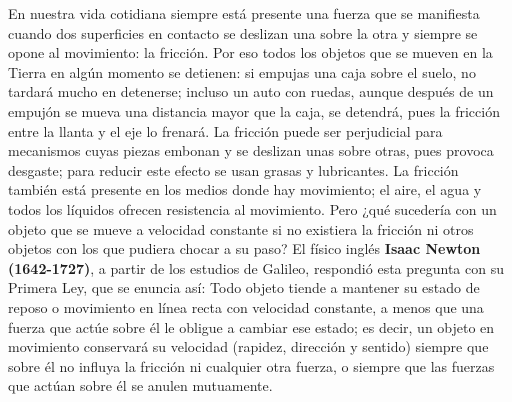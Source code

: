 \documentclass[11pt]{book}
\begin{document}
En nuestra vida cotidiana siempre está presente una fuerza que se manifiesta cuando
dos superficies en contacto se deslizan una sobre la otra y siempre se opone al movimiento:
la fricción. Por eso todos los objetos que se mueven en la Tierra en algún momento se
detienen: si empujas una caja sobre el suelo, no tardará mucho en detenerse; incluso
un auto con ruedas, aunque después de un empujón se mueva una distancia mayor que la
caja, se detendrá, pues la fricción entre la llanta y el eje lo frenará. La fricción
puede ser perjudicial para mecanismos cuyas piezas embonan y se deslizan unas sobre
otras, pues provoca desgaste; para reducir este efecto se usan grasas y lubricantes.
La fricción también está presente en los medios donde hay movimiento; el aire,
el agua y todos los líquidos ofrecen resistencia al movimiento. Pero ¿qué sucedería
con un objeto que se mueve a velocidad constante si no existiera la fricción ni otros
objetos con los que pudiera chocar a su paso? El físico inglés \textbf{Isaac Newton (1642-1727)},
a partir de los estudios de Galileo, respondió esta pregunta con su Primera Ley, que
se enuncia así: Todo objeto tiende a mantener su estado de reposo o movimiento en línea
recta con velocidad constante, a menos que una fuerza que actúe sobre él le obligue a
cambiar ese estado; es decir, un objeto en movimiento conservará su velocidad (rapidez,
dirección y sentido) siempre que sobre él no influya la fricción ni cualquier otra fuerza,
o siempre que las fuerzas que actúan sobre él se anulen mutuamente.

\newpage
\end{document}
